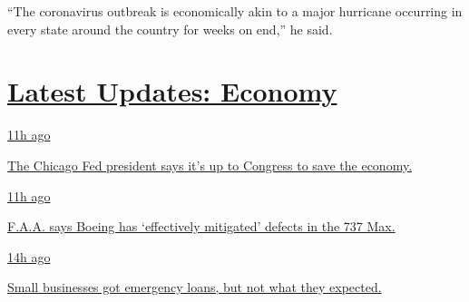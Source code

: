 ``The coronavirus outbreak is economically akin to a major hurricane
occurring in every state around the country for weeks on end,'' he said.

\hypertarget{latest-updates-economy}{%
\section{\texorpdfstring{\href{https://www.nytimes3xbfgragh.onion/live/2020/08/03/business/stock-market-today-coronavirus?action=click\&pgtype=Article\&state=default\&region=MAIN_CONTENT_1\&context=storylines_live_updates}{Latest
Updates:
Economy}}{Latest Updates: Economy}}\label{latest-updates-economy}}

\href{https://www.nytimes3xbfgragh.onion/live/2020/08/03/business/stock-market-today-coronavirus?action=click\&pgtype=Article\&state=default\&region=MAIN_CONTENT_1\&context=storylines_live_updates\#the-chicago-fed-president-says-its-up-to-congress-to-save-the-economy}{11h
ago}

\href{https://www.nytimes3xbfgragh.onion/live/2020/08/03/business/stock-market-today-coronavirus?action=click\&pgtype=Article\&state=default\&region=MAIN_CONTENT_1\&context=storylines_live_updates\#the-chicago-fed-president-says-its-up-to-congress-to-save-the-economy}{The
Chicago Fed president says it's up to Congress to save the economy.}

\href{https://www.nytimes3xbfgragh.onion/live/2020/08/03/business/stock-market-today-coronavirus?action=click\&pgtype=Article\&state=default\&region=MAIN_CONTENT_1\&context=storylines_live_updates\#faa-says-boeing-has-effectively-mitigated-defects-in-the-737-max}{11h
ago}

\href{https://www.nytimes3xbfgragh.onion/live/2020/08/03/business/stock-market-today-coronavirus?action=click\&pgtype=Article\&state=default\&region=MAIN_CONTENT_1\&context=storylines_live_updates\#faa-says-boeing-has-effectively-mitigated-defects-in-the-737-max}{F.A.A.
says Boeing has `effectively mitigated' defects in the 737 Max.}

\href{https://www.nytimes3xbfgragh.onion/live/2020/08/03/business/stock-market-today-coronavirus?action=click\&pgtype=Article\&state=default\&region=MAIN_CONTENT_1\&context=storylines_live_updates\#small-businesses-got-emergency-loans-but-not-what-they-expected}{14h
ago}

\href{https://www.nytimes3xbfgragh.onion/live/2020/08/03/business/stock-market-today-coronavirus?action=click\&pgtype=Article\&state=default\&region=MAIN_CONTENT_1\&context=storylines_live_updates\#small-businesses-got-emergency-loans-but-not-what-they-expected}{Small
businesses got emergency loans, but not what they expected.}

